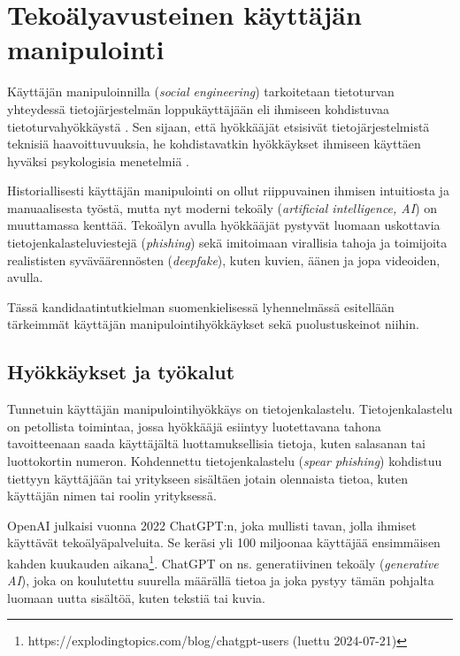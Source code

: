 \chapter*{Tekoälyavusteinen käyttäjän\\manipulointi\label{chapter:finnish}}
\begin{comment}
\end{comment}


Käyttäjän manipuloinnilla (\textit{social engineering}) tarkoitetaan tietoturvan yhteydessä tietojärjestelmän loppukäyttäjään eli ihmiseen kohdistuvaa tietoturvahyökkäystä \citep{mitnick_The_Art_of_Deception_2003}. Sen sijaan, että hyökkääjät etsisivät tietojärjestelmistä teknisiä haavoittuvuuksia, he kohdistavatkin hyökkäykset ihmiseen käyttäen hyväksi psykologisia menetelmiä \citep{wang_Defining_Social_Engineering_2020}.

Historiallisesti käyttäjän manipulointi on ollut riippuvainen ihmisen intuitiosta ja manuaalisesta työstä, mutta nyt moderni tekoäly (\textit{artificial intelligence, AI}) on muuttamassa kenttää. Tekoälyn avulla hyökkääjät pystyvät luomaan uskottavia tietojenkalasteluviestejä (\textit{phishing}) sekä imitoimaan virallisia tahoja ja toimijoita realististen syväväärennösten (\textit{deepfake}), kuten kuvien, äänen ja jopa videoiden, avulla.

Tässä kandidaatintutkielman suomenkielisessä lyhennelmässä esitellään tärkeimmät käyttäjän manipulointihyökkäykset sekä puolustuskeinot niihin.

\section*{Hyökkäykset ja työkalut}

Tunnetuin käyttäjän manipulointihyökkäys on tietojenkalastelu. Tietojenkalastelu on petollista toimintaa, jossa hyökkääjä esiintyy luotettavana tahona tavoitteenaan saada käyttäjältä luottamuksellisia tietoja, kuten salasanan tai luottokortin numeron. Kohdennettu tietojenkalastelu (\textit{spear phishing}) kohdistuu tiettyyn käyttäjään tai yritykseen sisältäen jotain olennaista tietoa, kuten käyttäjän nimen tai roolin yrityksessä.

OpenAI julkaisi vuonna 2022 ChatGPT:n, joka mullisti tavan, jolla ihmiset käyttävät tekoälyäpalveluita. Se keräsi yli 100 miljoonaa käyttäjää ensimmäisen kahden kuukauden aikana\footnote{https://explodingtopics.com/blog/chatgpt-users (luettu 2024-07-21)}. ChatGPT on ns. generatiivinen tekoäly (\textit{generative AI}), joka on koulutettu suurella määrällä tietoa ja joka pystyy tämän pohjalta luomaan uutta sisältöä, kuten tekstiä tai kuvia.

